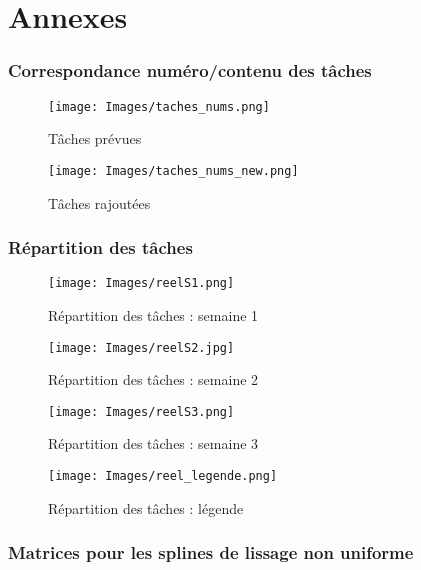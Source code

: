 \documentclass[a4paper,12pt]{article} %
\begin{document}
\renewcommand\partname{}
\part{Annexes}

    \section{\label{annexe1}Correspondance numéro/contenu des tâches}
        
        	\begin{figure}[H]
        	    \centering
        	    \texttt{[image: Images/taches\_nums.png]}
        	    \caption{Tâches prévues}
        	\end{figure}
        
        	\begin{figure}[H]
        	    \centering
        	    \texttt{[image: Images/taches\_nums\_new.png]}
        	    \caption{Tâches rajoutées}
        	\end{figure}


	\section{\label{annexe2}Répartition des tâches}
	
	        \begin{figure}[H]
        	    \centering
        	    \texttt{[image: Images/reelS1.png]}
        	    \caption{Répartition des tâches : semaine 1}
        	\end{figure}
        	
        	\begin{figure}[H]
        	    \centering
        	    \texttt{[image: Images/reelS2.jpg]}
        	    \caption{Répartition des tâches : semaine 2}
        	\end{figure}
        	
        	\begin{figure}[H]
        	    \centering
        	    \texttt{[image: Images/reelS3.png]}
        	    \caption{Répartition des tâches : semaine 3}
        	\end{figure}

        	\begin{figure}[H]
        	    \centering
        	    \texttt{[image: Images/reel\_legende.png]}
        	    \caption{Répartition des tâches : légende}
        	\end{figure}
        	
    
    \section{\label{annexe3}Matrices pour les splines de lissage non uniforme}
    
\end{document}
